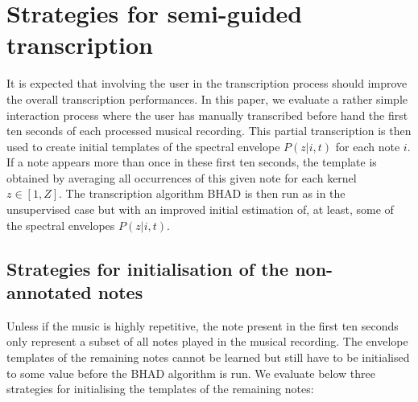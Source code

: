 \documentclass{article}
\begin{document}
\vspace{0.3cm}


\section{Strategies for semi-guided transcription}
\label{sec:semiguided}


It is expected that involving the user in the transcription process should improve the overall transcription performances. In this paper, we evaluate a rather simple interaction process where the user has manually transcribed  before hand the first ten seconds of each processed musical recording. This partial transcription is then used to create initial templates of the spectral envelope $P(z|i,t)$ for each note $i$. If a note appears more than once in these first ten seconds, the template is obtained by averaging all occurrences of this given note for each kernel $z \in \left[1,Z\right]$. The transcription algorithm BHAD is then run as in the unsupervised case but with an improved initial estimation of, at least, some of the spectral envelopes $P(z|i,t)$.

\subsection{Strategies for initialisation of the non-annotated notes}

Unless if the music is highly repetitive, the note present in the first ten seconds only represent a subset of all notes played in the musical recording. The envelope templates of the remaining notes cannot be learned but still have to be initialised to some value before the BHAD algorithm is run. We evaluate below three strategies for initialising the templates of the remaining notes:  
\end{document}
